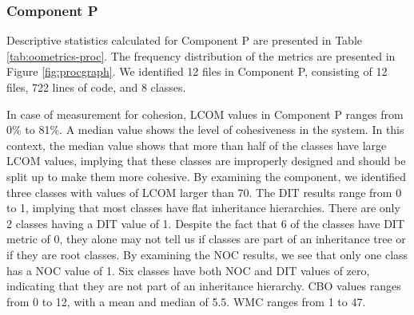 \subsubsection{Component P}
Descriptive statistics calculated for Component P are presented in Table \ref{tab:oometrics-proc}. The frequency distribution of the metrics are presented in Figure \ref{fig:procgraph}. We identified 12 files in Component P, consisting of 12 files, 722 lines of code, and 8 classes.

In case of measurement for cohesion, LCOM values in Component P ranges from 0\% to 81\%. A median value shows the level of cohesiveness in the system. In this context, the median value shows that more than half of the classes have large LCOM values, implying that these classes are improperly designed and should be split up to make them more cohesive. By examining the component, we identified three classes with values of LCOM larger than 70. The DIT results range from 0 to 1, implying that most classes have flat inheritance hierarchies. There are only 2 classes having a DIT value of 1. Despite the fact that 6 of the classes have DIT metric of 0, they alone may not tell us if classes are part of an inheritance tree or if they are root classes. By examining the NOC results, we see that only one class has a NOC value of 1. Six classes have both NOC and DIT values of zero, indicating that they are not part of an inheritance hierarchy. CBO values ranges from 0 to 12, with a mean and median of 5.5. WMC ranges from 1 to 47. 


